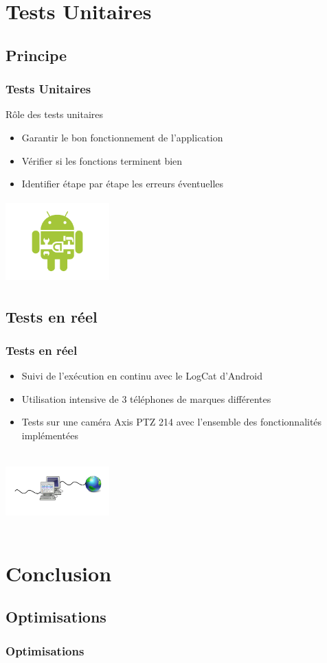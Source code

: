 \documentclass{beamer}
\begin{document}
\section{Tests Unitaires}
\subsection{Principe}
  \begin{frame}
\begin{minipage}{0.59\textwidth}
\frametitle{Tests Unitaires}
Rôle des tests unitaires
  \begin{itemize}
 \item<2-> Garantir le bon fonctionnement de l'application
    \item<3-> Vérifier si les fonctions terminent bien
    \item<4-> Identifier étape par étape les erreurs éventuelles
\end{itemize} 
\end{minipage}
\begin{minipage}{0.39\textwidth}
 \includegraphics[width=4cm, height=3.2cm]{test.png}
\end{minipage}
\end{frame}

\subsection{Tests en réel}
 \begin{frame}
\begin{minipage}{0.59\textwidth}
   \frametitle{Tests en réel}
\begin{itemize}
    \item<2-> Suivi de l'exécution en continu avec le LogCat d'Android
    \item<3-> Utilisation intensive de 3 téléphones de marques différentes
    \item<4-> Tests sur une caméra Axis PTZ 214 avec l'ensemble des
    fonctionnalités implémentées
   \end{itemize}
\end{minipage}
\begin{minipage}{0.39\textwidth}
 \includegraphics[width=4cm, height=3cm]{Wire.png}
\end{minipage}
\end{frame}

\section{Conclusion}
\subsection{Optimisations}
 \begin{frame}
   \frametitle{Optimisations}

\end{frame}
\end{document}
